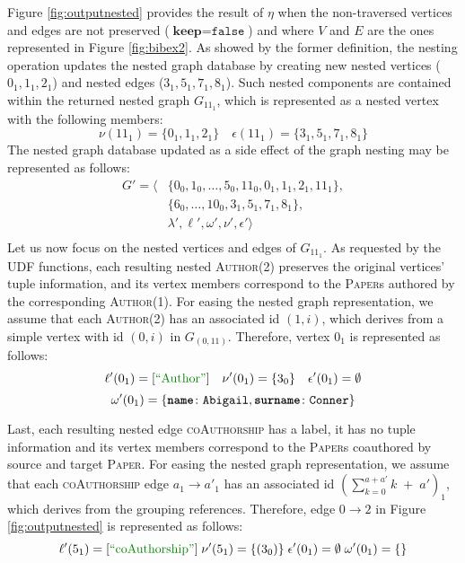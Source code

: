 \begin{example}[label=exNest]
	Figure \ref{fig:outputnested} provides the result of $\eta$ when the non-traversed vertices and edges are not preserved ($\textbf{keep}=\texttt{false}$) and where $V$ and $E$ are the ones represented in Figure \ref{fig:bibex2}. As showed by the former definition, the nesting operation updates the nested graph database by creating new nested vertices ($0_1,1_1,2_1$) and nested edges ($3_1,5_1,7_1,8_1$). Such nested components are contained within the returned nested graph $G_{11_1}$, which is represented as a nested vertex with the following members:
	\[\nu(11_1)=\{0_1,1_1,2_1\}\quad \epsilon(11_1)=\{3_1,5_1,7_1,8_1\}\]
	The nested graph database updated as a side effect of the graph nesting may be represented as follows:
	\[\begin{split}
	G'=\big\langle &\{0_0,1_0,\dots,5_0,11_0,0_1,1_1,2_1,11_1\},\\
	& \{6_0,\dots,10_0,3_1,5_1,7_1,8_1\}, \\
	& \lambda',\ell',\omega',\nu',\epsilon'\big\rangle\\
	\end{split}\]
	Let us now focus on the nested vertices and edges of $G_{11_1}$. As requested by the UDF functions, each resulting nested \textsc{Author}(2) preserves the original  vertices' tuple information, and its vertex members correspond to the \textsc{Paper}s authored by the corresponding \textsc{Author}(1). For easing the nested graph representation, we assume that each \textsc{Author}(2) has an associated  id $(1,i)$, which derives from a simple vertex with id $(0,i)$ in $G_{(0,11)}$. Therefore, vertex $0_1$ is represented as follows:
	\[\ell'(0_1)=[\mstr{Author}]\quad\nu'(0_1)=\{3_0\}\quad \epsilon'(0_1)=\emptyset\] \[\omega'(0_1)=\{\texttt{\textbf{name}}\colon\texttt{Abigail},\texttt{\textbf{surname}}\colon\texttt{Conner}\}\]
	
	Last, each resulting nested edge \textsc{coAuthorship} has a  label, it has no tuple information and its vertex members correspond to the \textsc{Paper}s coauthored by source and target \textsc{Paper}.
	For easing the nested graph representation, we assume that each \textsc{coAuthorship} edge $a_1\to a'_1$ has an associated id $(\sum_{k=0}^{a+a'}k\;+\;a')_{1}$, which derives from the grouping references. Therefore, edge $0\to 2$ in Figure \ref{fig:outputnested} is represented as follows:
	\[\ell'(5_1)=[\mstr{coAuthorship}]\;\nu'(5_1)=\{(3_0)\}\;\epsilon'(0_1)=\emptyset\; \omega'(0_1)=\{\}\] 
\end{example}

